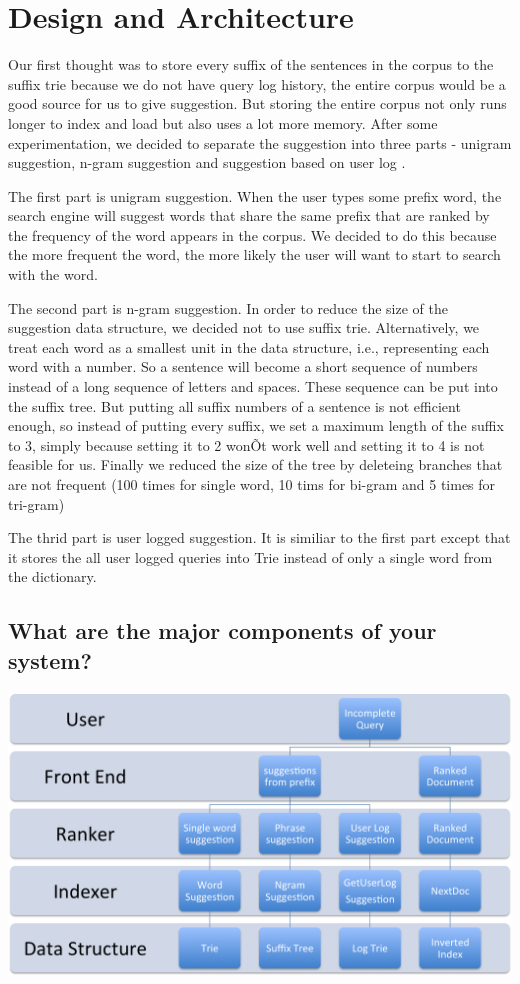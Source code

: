 \documentclass{article}
\begin{document}
\section{Design and Architecture}
Our first thought was to store every suffix of the sentences in the corpus to the suffix trie because we do not have query log history, the entire corpus would be a good source for us to give suggestion. But storing the entire corpus not only runs longer to index and load but also uses a lot more memory. After some experimentation, we decided to separate the suggestion into three parts - unigram suggestion, n-gram suggestion and suggestion based on user log \cite{sigir}.

The first part is unigram suggestion. When the user types some prefix word, the search engine will suggest words that share the same prefix that are ranked by the frequency of the word appears in the corpus. We decided to do this because the more frequent the word, the more likely the user will want to start to  search with the word.

The second part is n-gram suggestion. In order to reduce the size of the suggestion data structure, we decided not to use suffix trie\cite{intro}. Alternatively, we treat each word as a smallest unit in the data structure, i.e., representing each word with a number. So a sentence will become a short sequence of numbers instead of a long sequence of letters and spaces. These sequence can be put into the suffix tree. But putting all suffix numbers of a sentence is not efficient enough, so instead of putting every suffix, we set a maximum length of the suffix to 3, simply because setting it to 2 wonÕt work well and setting it to 4 is not feasible for us. Finally we reduced the size of the tree by deleteing branches that are not frequent (100 times for single word, 10 tims for bi-gram and 5 times for tri-gram)

The thrid part is user logged suggestion. It is similiar to the first part except that it stores the all user logged queries into Trie instead of only a single word from the dictionary.
\subsection{What are the major components of your system?}
\begin{center}
\includegraphics[scale=0.5] {WorkFlow.png}
\end{center}
\end{document}
